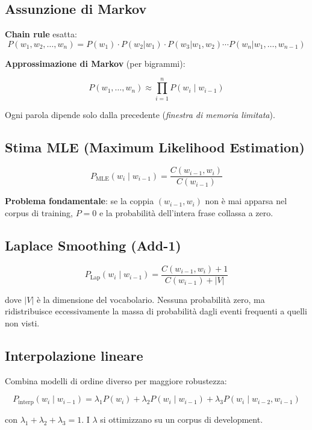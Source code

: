 \documentclass[12pt,a4paper]{article}
\begin{document}
\subsection{Assunzione di Markov}

\textbf{Chain rule} esatta:
\[
P(w_1, w_2, \dots, w_n) = P(w_1)\cdot P(w_2|w_1)\cdot P(w_3|w_1,w_2)\cdots P(w_n|w_1,\dots,w_{n-1})
\]

\textbf{Approssimazione di Markov} (per bigrammi):
\begin{formulabox}
\[
P(w_1, \dots, w_n) \approx \prod_{i=1}^{n} P(w_i \mid w_{i-1})
\]
\end{formulabox}
Ogni parola dipende solo dalla precedente (\emph{finestra di memoria limitata}).

\subsection{Stima MLE (Maximum Likelihood Estimation)}

\begin{formulabox}
\[
P_{\text{MLE}}(w_i \mid w_{i-1}) = \frac{C(w_{i-1}, w_i)}{C(w_{i-1})}
\]
\end{formulabox}

\textbf{Problema fondamentale}: se la coppia $(w_{i-1}, w_i)$ non è mai apparsa nel corpus di training, $P = 0$ e la probabilità dell'intera frase collassa a zero.

\subsection{Laplace Smoothing (Add-1)}

\begin{formulabox}
\[
P_{\text{Lap}}(w_i \mid w_{i-1}) = \frac{C(w_{i-1}, w_i) + 1}{C(w_{i-1}) + |V|}
\]
\end{formulabox}

dove $|V|$ è la dimensione del vocabolario. Nessuna probabilità zero, ma ridistribuisce eccessivamente la massa di probabilità dagli eventi frequenti a quelli non visti.

\subsection{Interpolazione lineare}

Combina modelli di ordine diverso per maggiore robustezza:

\begin{formulabox}
\[
P_{\text{interp}}(w_i \mid w_{i-1}) = \lambda_1 P(w_i) + \lambda_2 P(w_i \mid w_{i-1}) + \lambda_3 P(w_i \mid w_{i-2}, w_{i-1})
\]
\end{formulabox}
con $\lambda_1 + \lambda_2 + \lambda_3 = 1$. I $\lambda$ si ottimizzano su un corpus di development.
\end{document}
